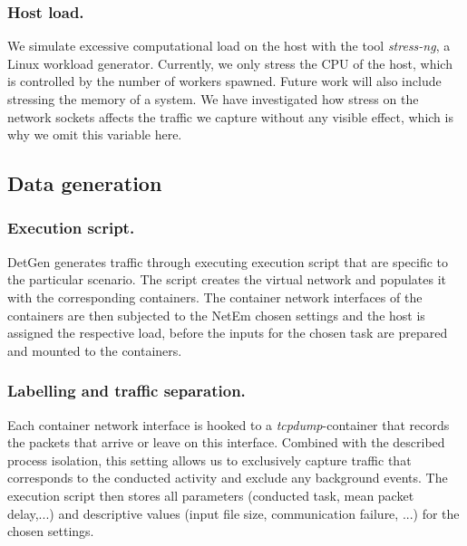 \documentclass[runningheads]{llncs}
\begin{document}
\subsubsection{Host load.}

We simulate excessive computational load on the host with the tool \emph{stress-ng}, a Linux workload generator. Currently, we only stress the CPU of the host, which is controlled by the number of workers spawned. Future work will also include stressing the memory of a system. We have investigated how stress on the network sockets affects the traffic we capture without any visible effect, which is why we omit this variable here. 

\subsection{Data generation}

\subsubsection*{Execution script.}

DetGen generates traffic through executing execution script that are specific to the particular scenario. The script creates the virtual network and populates it with the corresponding containers. The container network interfaces of the containers are then subjected to the NetEm chosen settings and the host is assigned the respective load, before the inputs for the chosen task are prepared and mounted to the containers. 


\subsubsection*{Labelling and traffic separation.}

Each container network interface is hooked to a \emph{tcpdump}-container that records the packets that arrive or leave on this interface. Combined with the described process isolation, this setting allows us to exclusively capture traffic that corresponds to the conducted activity and exclude any background events. The execution script then stores all parameters (conducted task, mean packet delay,...) and descriptive values (input file size, communication failure, ...) for the chosen settings.
\end{document}
